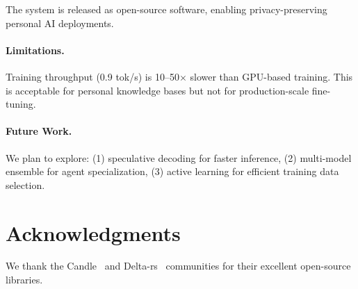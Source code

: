 \documentclass[11pt,a4paper]{article}
\theoremstyle{plain}
\theoremstyle{definition}
\begin{document}
The system is released as open-source software, enabling privacy-preserving
personal AI deployments.

\paragraph{Limitations.}
Training throughput (0.9 tok/s) is 10--50$\times$ slower than GPU-based
training. This is acceptable for personal knowledge bases but not for
production-scale fine-tuning.

\paragraph{Future Work.}
We plan to explore: (1) speculative decoding for faster inference,
(2) multi-model ensemble for agent specialization, (3) active learning
for efficient training data selection.

\section*{Acknowledgments}

We thank the Candle~\cite{candle} and Delta-rs~\cite{deltars} communities
for their excellent open-source libraries.
\end{document}

